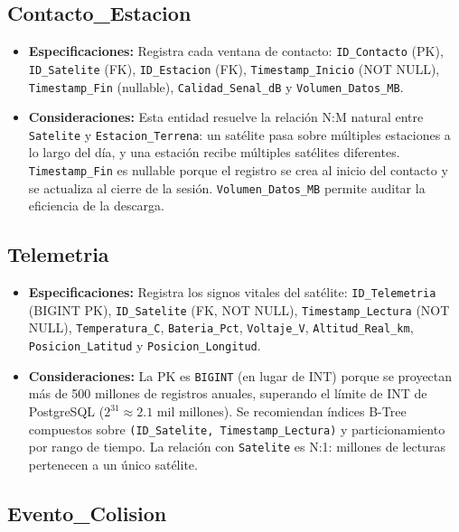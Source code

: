 \subsection{Contacto\_Estacion}

\begin{itemize}
    \item \textbf{Especificaciones:} Registra cada ventana de contacto: \texttt{ID\_Contacto} (PK), \texttt{ID\_Satelite} (FK), \texttt{ID\_Estacion} (FK), \texttt{Timestamp\_Inicio} (NOT NULL), \texttt{Timestamp\_Fin} (nullable), \texttt{Calidad\_Senal\_dB} y \texttt{Volumen\_Datos\_MB}.
    \item \textbf{Consideraciones:} Esta entidad resuelve la relación N:M natural entre \texttt{Satelite} y \texttt{Estacion\_Terrena}: un satélite pasa sobre múltiples estaciones a lo largo del día, y una estación recibe múltiples satélites diferentes. \texttt{Timestamp\_Fin} es nullable porque el registro se crea al inicio del contacto y se actualiza al cierre de la sesión. \texttt{Volumen\_Datos\_MB} permite auditar la eficiencia de la descarga.
\end{itemize}

\subsection{Telemetria}

\begin{itemize}
    \item \textbf{Especificaciones:} Registra los signos vitales del satélite: \texttt{ID\_Telemetria} (BIGINT PK), \texttt{ID\_Satelite} (FK, NOT NULL), \texttt{Timestamp\_Lectura} (NOT NULL), \texttt{Temperatura\_C}, \texttt{Bateria\_Pct}, \texttt{Voltaje\_V}, \texttt{Altitud\_Real\_km}, \texttt{Posicion\_Latitud} y \texttt{Posicion\_Longitud}.
    \item \textbf{Consideraciones:} La PK es \texttt{BIGINT} (en lugar de INT) porque se proyectan más de 500 millones de registros anuales, superando el límite de INT de PostgreSQL ($2^{31} \approx 2.1$ mil millones). Se recomiendan índices B-Tree compuestos sobre \texttt{(ID\_Satelite, Timestamp\_Lectura)} y particionamiento por rango de tiempo. La relación con \texttt{Satelite} es N:1: millones de lecturas pertenecen a un único satélite.
\end{itemize}

\subsection{Evento\_Colision}


